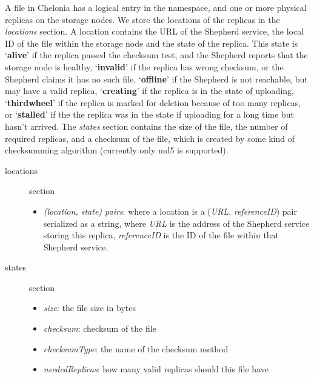\documentclass{book}
\begin{document}
A file in Chelonia has a logical entry in the namespace, and one or more physical replicas on the storage nodes. We store the locations of the replicas in the \emph{locations} section. A location contains the URL of the Shepherd service, the local ID of the file within the storage node and the state of the replica. This state is `\textbf{alive}' if the replica passed the checksum test, and the Shepherd reports that the storage node is healthy, `\textbf{invalid}' if the replica has wrong checksum, or the Shepherd claims it has no such file, `\textbf{offline}' if the Shepherd is not reachable, but may have a valid replica, `\textbf{creating}' if the replica is in the state of uploading, `\textbf{thirdwheel}' if the replica is marked for deletion because of too many replicas, or `\textbf{stalled}' if the the replica was in the state if uploading for a long time but hasn't arrived. The \emph{states} section contains the size of the file, the number of required replicas, and a checksum of the file, which is created by some kind of checksumming algorithm (currently only md5 is supported).

\begin{description}
    \item [locations] section 
    \begin{itemize}
        \item \emph{(location, state) pairs}: where a location is a (\emph{URL}, \emph{referenceID}) pair serialized as a string, where \emph{URL} is the address of the Shepherd service storing this replica, \emph{referenceID} is the ID of the file within that Shepherd service.
    \end{itemize}
    \item [states] section 
    \begin{itemize}
        \item \emph{size}: the file size in bytes
        \item \emph{checksum}: checksum of the file
        \item \emph{checksumType}: the name of the checksum method
        \item \emph{neededReplicas}: how many valid replicas should this file have 
    \end{itemize}
\end{description}




\end{document}
